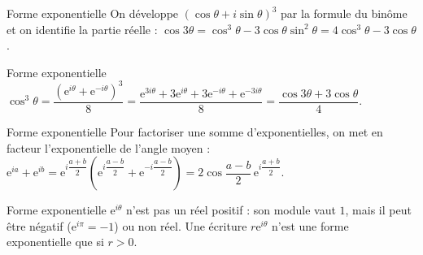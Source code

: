 \documentclass[aspectratio=169,10pt]{beamer}
\providecommand{\e}{\mathrm{e}}
\begin{document}
\begin{frame}{Forme exponentielle}
On développe \((\cos\theta+i\sin\theta)^3\) par la formule du binôme et on identifie la partie réelle :
\(\cos3\theta=\cos^3\theta-3\cos\theta\sin^2\theta=4\cos^3\theta-3\cos\theta\).
\end{frame}
\begin{frame}{Forme exponentielle}
\(\cos^3\theta=\dfrac{\left(\e^{i\theta}+\e^{-i\theta}\right)^3}{8}=\dfrac{\e^{3i\theta}+3\e^{i\theta}+3\e^{-i\theta}+\e^{-3i\theta}}8=\dfrac{\cos3\theta+3\cos\theta}4\).
\end{frame}
\begin{frame}{Forme exponentielle}
Pour factoriser une somme d'exponentielles, on met en facteur l'exponentielle de l'angle moyen : \(\e^{ia}+\e^{ib}=\e^{i\dfrac{a+b}2}\left(\e^{i\dfrac{a-b}2}+\e^{-i\dfrac{a-b}2}\right)=2\cos\dfrac{a-b}2\,\e^{i\dfrac{a+b}2}\).
\end{frame}
\begin{frame}{Forme exponentielle}
\(\e^{i\theta}\) n'est pas un réel positif : son module vaut \(1\), mais il peut être négatif (\(\e^{i\pi}=-1\)) ou non réel. Une écriture \(r\e^{i\theta}\) n'est une forme exponentielle que si \(r>0\).
\end{frame}
\end{document}
